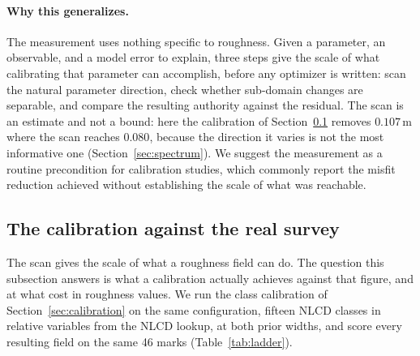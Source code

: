 \documentclass[11pt]{article}
\begin{document}
\paragraph{Why this generalizes.}
The measurement uses nothing specific to roughness. Given a
parameter, an observable, and a model error to explain, three steps
give the scale of what calibrating that parameter can accomplish,
before any optimizer is written: scan the natural parameter direction,
check whether sub-domain changes are separable, and compare the
resulting authority against the residual. The scan is an estimate and
not a bound: here the calibration of Section~\ref{sec:calibrated}
removes $0.107$\,m where the scan reaches $0.080$, because the
direction it varies is not the most informative one
(Section~\ref{sec:spectrum}). We suggest the measurement as a routine
precondition for calibration studies, which commonly report the misfit
reduction achieved without establishing the scale of what was
reachable.

\subsection{The calibration against the real survey}
\label{sec:calibrated}

The scan gives the scale of what a roughness field can do. The question
this subsection answers is what a calibration actually achieves
against that figure, and at what cost in roughness values. We run the class
calibration of Section~\ref{sec:calibration} on the same
configuration, fifteen NLCD classes in relative variables from the
NLCD lookup, at both prior widths, and score every resulting field on
the same 46 marks (Table~\ref{tab:ladder}).
\end{document}
